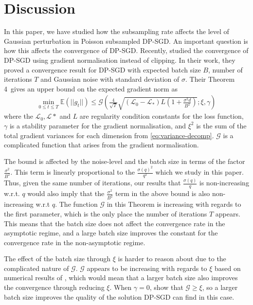 \documentclass{article}
\theoremstyle{plain}
\theoremstyle{definition}
\theoremstyle{remark}
\begin{document}
\section{Discussion}
In this paper, we have studied how the subsampling rate affects the level of Gaussian 
perturbation in Poisson subsampled DP-SGD. An important question is how this affects
the convergence of DP-SGD. Recently, \citet{Bu0ZK23} studied the convergence of DP-SGD using 
gradient normalisation instead of clipping.
In their work, they proved a convergence result for DP-SGD with expected batch size $B$, 
number of iterations $T$ and Gaussian noise with standard deviation of $\sigma$. Their Theorem 
4~gives an upper bound on the expected gradient norm as 
\begin{align*}
    \min_{0 \leq t \leq T} \mathbb{E}(||g_t||) 
        \leq \mathcal{G}\left( \frac{4}{\sqrt{T}} \sqrt{(\mathcal{L}_0-\mathcal{L}_{*} )L\left(1 + \frac{\sigma^2 d}{B^2}\right)}; \xi, \gamma \right)
\end{align*}
where the $\mathcal{L}_0, \mathcal{L}*$ and $L$ are regularity condition constants for the loss 
function, $\gamma$ is a stability parameter for the gradient normalisation, and 
$\xi^2$ is the sum of the total gradient variances for each dimension from 
\eqref{eq:variance-decomp}. $\mathcal{G}$ is a complicated function that arises from the gradient 
normalisation.

The bound is affected by the noise-level and the batch size in terms of the factor 
$\frac{\sigma^2}{B^2}$. This term is linearly proportional to the $\frac{\sigma(q)^2}{q^2}$ which 
we study in this paper. Thus, given the same number of iterations, our results that 
$\frac{\sigma(q)}{q}$ is non-increasing w.r.t. $q$ would also imply that the 
$\frac{\sigma^2}{B^2}$ term in the above bound is also non-increasing w.r.t $q$. 
The function $\mathcal{G}$ in this Theorem is increasing with regards to the first parameter, 
which is the only place the number of iterations $T$ appears.
This means that the batch size does not affect the convergence rate in the asymptotic regime,
and a large batch size improves the constant for the convergence rate in the 
non-asymptotic regime.

The effect of the batch size through $\xi$ is harder to reason about due to the 
complicated nature of $\mathcal{G}$.
$\mathcal{G}$ appears to be increasing with regards to $\xi$ based on numerical results 
of \citet{Bu0ZK23}, which would mean that a larger batch 
size also improves the convergence through reducing $\xi$.
When $\gamma = 0$, \citet{Bu0ZK23} show that $\mathcal{G} \geq \xi$, 
so a larger batch size improves the quality of the solution DP-SGD can find in this case. 
\end{document}
